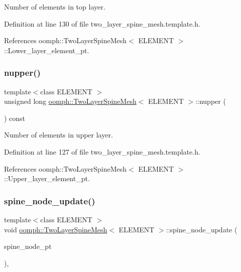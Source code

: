 Number of elements in top layer. 



Definition at line 130 of file two\+\_\+layer\+\_\+spine\+\_\+mesh.\+template.\+h.



References oomph\+::\+Two\+Layer\+Spine\+Mesh$<$ E\+L\+E\+M\+E\+N\+T $>$\+::\+Lower\+\_\+layer\+\_\+element\+\_\+pt.

\mbox{\label{classoomph_1_1TwoLayerSpineMesh_a7d92e162c4fd6e70627982f761d1a66c}} 
\subsubsection{\texorpdfstring{nupper()}{nupper()}}
{\footnotesize\ttfamily template$<$class E\+L\+E\+M\+E\+NT $>$ \\
unsigned long \hyperlink{classoomph_1_1TwoLayerSpineMesh}{oomph\+::\+Two\+Layer\+Spine\+Mesh}$<$ E\+L\+E\+M\+E\+NT $>$\+::nupper (\begin{DoxyParamCaption}{ }\end{DoxyParamCaption}) const\hspace{0.3cm}{\ttfamily [inline]}}



Number of elements in upper layer. 



Definition at line 127 of file two\+\_\+layer\+\_\+spine\+\_\+mesh.\+template.\+h.



References oomph\+::\+Two\+Layer\+Spine\+Mesh$<$ E\+L\+E\+M\+E\+N\+T $>$\+::\+Upper\+\_\+layer\+\_\+element\+\_\+pt.

\mbox{\label{classoomph_1_1TwoLayerSpineMesh_ad9b80ae7e34be72ca03f6d1bc6062de4}} 
\subsubsection{\texorpdfstring{spine\+\_\+node\+\_\+update()}{spine\_node\_update()}}
{\footnotesize\ttfamily template$<$class E\+L\+E\+M\+E\+NT $>$ \\
void \hyperlink{classoomph_1_1TwoLayerSpineMesh}{oomph\+::\+Two\+Layer\+Spine\+Mesh}$<$ E\+L\+E\+M\+E\+NT $>$\+::spine\+\_\+node\+\_\+update (\begin{DoxyParamCaption}\item[{\hyperlink{classoomph_1_1SpineNode}{Spine\+Node} $\ast$}]{spine\+\_\+node\+\_\+pt }\end{DoxyParamCaption})\hspace{0.3cm}{\ttfamily [inline]}, {\ttfamily [virtual]}}



